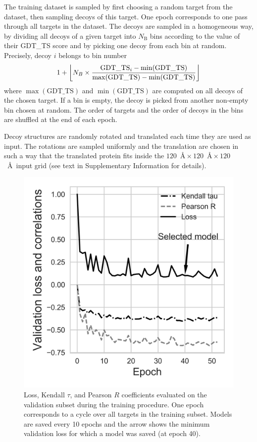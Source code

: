 \documentclass{bioinfo}
\DeclarePairedDelimiter\floor{\lfloor}{\rfloor}
\begin{document}
The training dataset is sampled by first choosing a random target from
the dataset, then sampling decoys of this target. One epoch
corresponds to one pass through all targets in the dataset. The decoys
are sampled in a homogeneous way, by dividing all decoys of a given
target into $N_\text{B}$ bins according to the value of their GDT\_TS score
and by picking one decoy from each bin at random.
Precisely, decoy $i$ belongs to bin number 
\begin{equation}
1 + \floor*{ N_B \times \frac{\text{GDT\_TS}_i - \min(\text{GDT\_TS}) }{\max(\text{GDT\_TS}) - \min(\text{GDT\_TS})} }
\end{equation}
where $\max(\text{GDT\_TS})$ and $\min(\text{GDT\_TS})$ are computed
on all decoys of the chosen target.  If a bin
is empty, the decoy is picked from another non-empty bin chosen at
random.  The order of targets and the order of decoys in the bins are
shuffled at the end of each epoch.

Decoy structures are randomly rotated and translated each time they
are used as input. The rotations are sampled uniformly
\citep{shoemake1992uniform} and the translation are chosen in such a
way that the translated protein fits inside the $120$~\AA${}\times
120$~\AA${}\times 120$~\AA\ input grid (see text in Supplementary
Information for details).

\begin{figure}[!tpb]
    \centerline{\includegraphics[width=0.7\linewidth]{image4.png}}
    \caption{Loss, Kendall $\tau$, and Pearson $R$ coefficients
      evaluated on the validation subset during the training
      procedure.  One epoch corresponds to a cycle over all targets in
      the training subset. Models are saved every 10 epochs and the
      arrow shows the minimum validation loss for which a model was
      saved (at epoch 40).}
    \label{Fig:TrainingLoss}
\end{figure}
\end{document}

